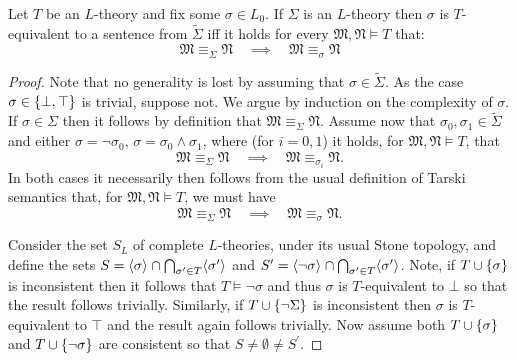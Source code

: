\begin{lem}\label{lem:bcls}
	Let $T$ be an $L$-theory and fix some $\sigma\in L_0$.  If $\Sigma$ is an $L$-theory then $\sigma$ is $T$-equivalent to a sentence from $\widetilde{\Sigma}$ iff it holds for every $\mathfrak{M},\mathfrak{N}\models T$ that:
	\begin{equation}
		\mathfrak{M}\equiv_\Sigma\mathfrak{N} \quad\implies\quad \mathfrak{M}\equiv_\sigma\mathfrak{N}
	\end{equation}
\end{lem}
\begin{proof}
	\forward  Note that no generality is lost by assuming that $\sigma\in\widetilde{\Sigma}$.  As the case $\sigma\in\lbrace \bot,\top\rbrace$ is trivial, suppose not.  We argue by induction on the complexity of $\sigma$.  If $\sigma\in\Sigma$ then it follows by definition that $\mathfrak{M}\equiv_\Sigma\mathfrak{N}$.  Assume now that $\sigma_0,\sigma_1\in\widetilde{\Sigma}$ and either $\sigma=\neg\sigma_0$, $\sigma=\sigma_0\wedge\sigma_1$, where (for $i=0,1$) it holds, for $\mathfrak{M},\mathfrak{N}\models T$, that
	\begin{equation}
		\mathfrak{M}\equiv_\Sigma\mathfrak{N} \quad\implies\quad \mathfrak{M}\equiv_{\sigma_i}\mathfrak{N}.
	\end{equation}
	In both cases it necessarily then follows from the usual definition of Tarski semantics that, for $\mathfrak{M},\mathfrak{N}\models T$, we must have
	\begin{equation}
		\mathfrak{M}\equiv_\Sigma\mathfrak{N} \quad\implies\quad \mathfrak{M}\equiv_\sigma\mathfrak{N}.
	\end{equation}

	\backward  Consider the set $S_L$ of complete $L$-theories, under its usual Stone topology, and define the sets $S=\langle \sigma\rangle_{}\cap\bigcap_{\sigma^\prime\in T}\langle \sigma^\prime\rangle_{}$ and $S^\prime=\langle \neg\sigma\rangle_{}\cap\bigcap_{\sigma^\prime\in T}\langle \sigma^\prime\rangle_{}$.  Note, if $T\cup\lbrace \sigma\rbrace$ is inconsistent then it follows that $T\models\neg\sigma$ and thus $\sigma$ is $T$-equivalent to $\bot$ so that the result follows trivially.  Similarly,  if $T\cup\lbrace \neg\Sigma\rbrace$ is inconsistent then $\sigma$ is $T$-equivalent to $\top$ and the result again follows trivially.  Now assume both $T\cup\lbrace \sigma\rbrace$ and $T\cup\lbrace \neg\sigma\rbrace$ are consistent so that $S\neq\emptyset\neq S^\prime$.


\end{proof}
